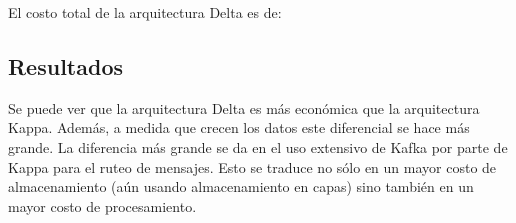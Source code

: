 El costo total de la arquitectura Delta es de:
\newline
\newline
{}
\newpage

\subsection{Resultados}

Se puede ver que la arquitectura Delta es más económica que la arquitectura Kappa.
Además, a medida que crecen los datos este diferencial se hace más grande.
La diferencia más grande se da en el uso extensivo de Kafka por parte de Kappa para el ruteo de mensajes. 
Esto se traduce no sólo en un mayor costo de almacenamiento (aún usando almacenamiento en capas) sino también en un mayor costo de procesamiento.
